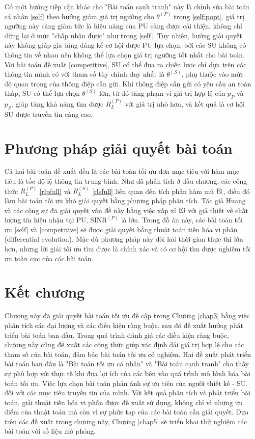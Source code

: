 \documentclass[../main.tex]{subfiles}
\begin{document}
Có một hướng tiếp cận khác cho "Bài toán cạnh tranh" này là chỉnh sửa bài toán cá nhân \eqref{self} theo hướng giảm giá trị ngưỡng cho $\theta^{(P)}$ trong \eqref{self:popt}, giá trị ngưỡng này càng giảm tức là hiệu năng của PU càng được cải thiện, không chỉ dừng lại ở mức "chấp nhận được" như trong \eqref{self}. Tuy nhiên, hướng giải quyết này không giúp gia tăng đáng kể cơ hội được PU lựa chọn, bởi các SU không có thông tin về nhau nên không thể lựa chọn giá trị ngưỡng tốt nhất cho bài toán. Với bài toán đề xuất \eqref{competitive}, SU có thể đưa ra chiến lược chỉ dựa trên các thông tin mình có với tham số tùy chỉnh duy nhất là $\theta^{(S)}$, phụ thuộc vào mức độ quan trọng của thông điệp cần gửi. Khi thông điệp cần gửi có yêu cầu an toàn thấp, SU có thể lựa chọn $\theta^{(S)}$ lớn, từ đó tăng phạm vi giá trị hợp lệ của $p_P$ và $p_S$, giúp tăng khả năng tìm được $R_{L}^{(P)}$ với giá trị nhỏ hơn, và kết quả là cơ hội SU được truyền tin càng cao.

\section{Phương pháp giải quyết bài toán}

Cả hai bài toán đề xuất đều là các bài toán tối ưu đơn mục tiêu với hàm mục tiêu là tốc độ lộ thông tin trung bình. Như đã phân tích ở đầu chương, các công thức $R_L^{(P)}$ \eqref{rlpfull} và $R_L^{(S)}$ \eqref{rlsfull} liên quan đến tích phân hàm mũ $\textnormal{Ei}$, điều đó làm bài toán tối ưu khó giải quyết bằng phương pháp phân tích. Tác giả Huang và các cộng sự \cite{huang2018secure} đã giải quyết vấn đề này bằng việc xấp xỉ $\textnormal{Ei}$ với giả thiết về chất lượng tín hiệu nhận tại PU, $\text{SINR}^{(P)}$ là lớn. Trong đồ án này, các bài toán tối ưu \eqref{self} và \eqref{competitive} sẽ được giải quyết bằng thuật toán tiến hóa vi phân (differential evolution). Mặc dù phương pháp này đòi hỏi thời gian thực thi lớn hơn, nhưng lời giải tối ưu tìm được là chính xác và có cơ hội tìm được nghiệm tối ưu toàn cục của các bài toán.

\section{Kết chương}

Chương này đã giải quyết bài toán tối ưu đề cập trong Chương \ref{chap3} bằng việc phân tích các đại lượng và các điều kiện ràng buộc, sau đó đề xuất hướng phát triển bài toán ban đầu. Trong quá trình đánh giá các điều kiện ràng buộc, chương này cũng đề xuất các công thức giúp xác định dải giá trị hợp lệ cho các tham số của bài toán, đảm bảo bài toán tối ưu có nghiệm. Hai đề xuất phát triển bài toán ban đầu là "Bài toán tối ưu cá nhân" và "Bài toán cạnh tranh" cho thấy sự phù hợp với thực tế khi đưa lợi ích của các bên vào quá trình mô hình hóa bài toán tối ưu. Việc lựa chọn bài toán phản ánh sự ưu tiên của người thiết kế - SU, đối với các mục tiêu truyền tin của mình. Với kết quả phân tích và phát triển bài toán, giải thuật tiến hóa vi phân được đề xuất sử dụng, không chỉ vì những ưu điểm của thuật toán mà còn vì sự phức tạp của các bài toán cần giải quyết. Dựa trên các đề xuất trong chương này, Chương \ref{chap5} sẽ triển khai thử nghiệm các bài toán với số liệu mô phỏng.
\end{document}
